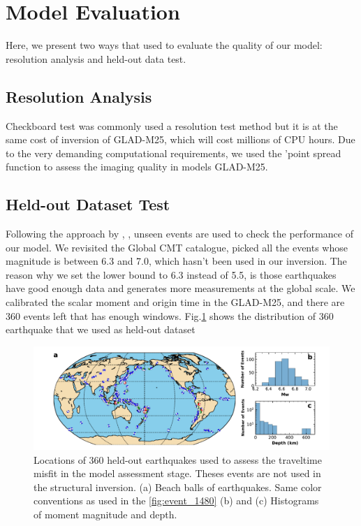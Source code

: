 \documentclass[extra,mreferee]{gji}
\begin{document}
\newpage

\section{Model Evaluation}

Here, we present two ways that used to evaluate the quality of our model:
resolution analysis and held-out data test.

\subsection{Resolution Analysis}
Checkboard test was commonly used a resolution test method but it is at the
same cost of inversion of GLAD-M25, which will cost millions of CPU hours.
Due to the very demanding computational requirements, we used the 'point
spread function to assess the imaging quality in models GLAD-M25.

\subsection{Held-out Dataset Test}
Following the approach by \cite{tape2009adjoint}, \cite{bozdaug2016global},
unseen events are used to check the performance of our
model. We revisited the Global CMT catalogue,
picked all the events whose magnitude is between 6.3 and 7.0, which hasn't
been used in our inversion. The reason why we set the lower bound to 6.3
instead of 5.5, is those earthquakes have good enough data and generates
more measurements at the global scale.
We calibrated the scalar moment and origin time in the GLAD-M25, and there
are 360 events left that has enough windows. Fig.\ref{fig:events_360} shows
the distribution of 360 earthquake that we used as held-out dataset

\begin{figure}
  \centering
  \includegraphics[width=\textwidth]{figures/events_360.pdf}
  \caption{Locations of 360 held-out earthquakes used to assess the traveltime misfit in the model assessment stage. Theses events are not used in the structural inversion. (a) Beach balls of earthquakes. Same color conventions as used in the \ref{fig:event_1480} (b) and (c) Histograms of moment magnitude and depth.}
  \label{fig:events_360}
\end{figure}
\end{document}
